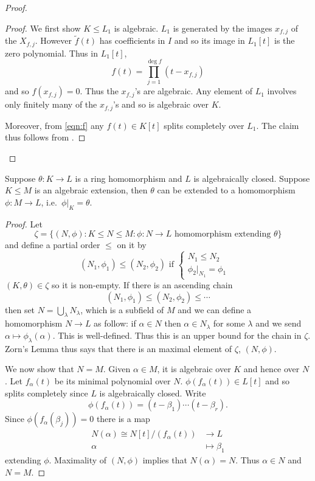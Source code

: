 \documentclass[a4paper]{article}
\begin{document}
\begin{proof}
  \begin{proof}
    We first show \(K \leq L_1\) is algebraic. \(L_1\) is generated by the images \(x_{f, j}\) of the \(X_{f, j}\). However \(\tilde f(t)\) has coefficients in \(I\) and so its image in \(L_1[t]\) is the zero polynomial. Thus in \(L_1[t]\),
    \begin{equation*}
      \label{eqn:f}
      f(t) = \prod_{j = 1}^{\deg f} (t - x_{f, j})
      \tag{\(\dag\)}
    \end{equation*}
    and so \(f(x_{f, j}) = 0\). Thus the \(x_{f, j}\)'s are algebraic. Any element of \(L_1\) involves only finitely many of the \(x_{f, j}\)'s and so is algebraic over \(K\).

    Moreover, from \eqref{eqn:f} any \(f(t) \in K[t]\) splits completely over \(L_1\). The claim thus follows from .
  \end{proof}
\end{proof}

\begin{theorem}
  Suppose \(\theta: K \to L\) is a ring homomorphism and \(L\) is algebraically closed. Suppose \(K \leq M\) is an algebraic extension, then \(\theta\) can be extended to a homomorphism \(\phi: M \to L\), i.e.\ \(\phi|_K = \theta\).
\end{theorem}

\begin{proof}
  Let
  \[
    \zeta = \{(N, \phi): K \leq N \leq M: \phi: N \to L \text{ homomorphism extending } \theta \}
  \]
  and define a partial order \(\leq\) on it by
  \[
    (N_1, \phi_1) \leq (N_2, \phi_2) \text{ if }
    \begin{cases}
      N_1 \leq N_2 & \\
      \phi_2|_{N_1} = \phi_1 & 
    \end{cases}
  \]
  \((K, \theta) \in \zeta\) so it is non-empty. If there is an ascending chain
  \[
    (N_1, \phi_1) \leq (N_2, \phi_2) \leq \cdots
  \]
  then set \(N = \bigcup_\lambda N_\lambda\), which is a subfield of \(M\) and we can define a homomorphism \(N \to L\) as follow: if \(\alpha \in N\) then \(\alpha \in N_\lambda\) for some \(\lambda\) and we send \(\alpha \mapsto \phi_\lambda(\alpha)\). This is well-defined. Thus this is an upper bound for the chain in \(\zeta\). Zorn's Lemma thus says that there is an maximal element of \(\zeta\), \((N, \phi)\).

  We now show that \(N = M\). Given \(\alpha \in M\), it is algebraic over \(K\) and hence over \(N\). Let \(f_\alpha(t)\) be its minimal polynomial over \(N\). \(\phi(f_\alpha(t)) \in L[t]\) and so splits completely since \(L\) is algebraically closed. Write
  \[
    \phi(f_\alpha(t)) = (t - \beta_1) \cdots (t - \beta_r).
  \]
  Since \(\phi(f_\alpha(\beta_j)) = 0\) there is a map
  \begin{align*}
    N(\alpha) \cong N[t]/(f_\alpha(t)) &\to L \\
    \alpha &\mapsto \beta_1
  \end{align*}
  extending \(\phi\). Maximality of \((N, \phi)\) implies that \(N(\alpha) = N\). Thus \(\alpha \in N\) and \(N = M\).
\end{proof}
\end{document}
